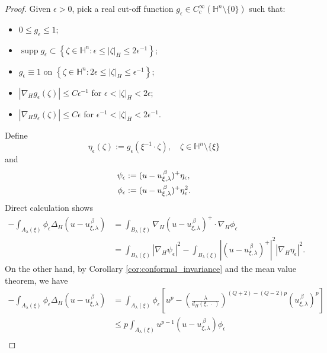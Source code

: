 \documentclass[reqno]{amsart}
\theoremstyle{definition}
\theoremstyle{remark}
\numberwithin{equation}{section}
\begin{document}
\begin{proof}
Given $\epsilon > 0$, pick a real cut-off function $g_{\epsilon} \in C_{c}^{\infty}(\mathbb{H}^n \setminus \{0\})$ such that:
\begin{itemize}
  \item $0 \leq g_{\epsilon} \leq 1$;
  \item $\operatorname{supp} g_{\epsilon} \subset \left\{ \zeta \in \mathbb{H}^n : \epsilon \leq |\zeta|_{\! H} \leq 2\epsilon^{-1} \right\}$;
  \item $g_{\epsilon} \equiv 1$ on $\left\{ \zeta \in \mathbb{H}^n : 2\epsilon \leq |\zeta|_{\! H} \leq \epsilon^{-1} \right\}$;
  \item $\left|\nabla_{\! H} g_{\epsilon}(\zeta)\right| \leq C\epsilon^{-1}$ for $\epsilon < |\zeta|_{\! H} < 2\epsilon$;  
  \item $\left|\nabla_{\! H} g_{\epsilon}(\zeta)\right| \leq C\epsilon$ for $\epsilon^{-1} < |\zeta|_{\! H} < 2\epsilon^{-1}$.
\end{itemize}
Define
\[
\eta_{\epsilon}(\zeta) := g_{\epsilon}(\xi^{-1} \cdot \zeta), \quad \zeta \in \mathbb{H}^n \setminus \{\xi\}
\]
and
\begin{align}\label{eqn:phiepsilon}
\psi_{\epsilon} &:= (u - u_{\xi,\lambda}^{\,\beta})^{+} \eta_{\epsilon},  \notag\\
\phi_{\epsilon} &:= (u - u_{\xi,\lambda}^{\,\beta})^{+} \eta_{\epsilon}^2.
\end{align}
Direct calculation shows
\begin{align*}
- \int_{A_{\lambda}(\xi)} \phi_{\epsilon} \Delta_{\! H} (u - u_{\xi,\lambda}^{\,\beta}) 
&= \int_{B_{\lambda}(\xi)} \nabla_{\! H} (u - u_{\xi,\lambda}^{\,\beta})^{+} \cdot \nabla_{\! H} \phi_{\epsilon} \\
&= \int_{B_{\lambda}(\xi)} \left| \nabla_{\! H} \psi_{\epsilon} \right|^2 - \int_{B_{\lambda}(\xi)} \left| (u - u_{\xi,\lambda}^{\,\beta})^{+} \right|^2 \left| \nabla_{\! H} \eta_{\epsilon} \right|^2.
\end{align*}
On the other hand, by Corollary \ref{cor:conformal_invariance} and the mean value theorem,
we have
\begin{align*}
- \int_{A_{\lambda}(\xi)} \phi_{\epsilon} \Delta_{\! H} (u - u_{\xi,\lambda}^{\,\beta}) 
&= \int_{A_{\lambda}(\xi)} \phi_{\epsilon} \left[ u^{p} - \left( \frac{\lambda}{ d_{\! H} 
(\xi, \,\cdot\,) } \right)^{(Q+2) - (Q-2)p} \left(u_{\xi,\lambda}^{\,\beta}\right)^{p} \right] \\
&\leq p \int_{A_{\lambda}(\xi)} u^{p-1} (u - u_{\xi,\lambda}^{\,\beta}) \phi_{\epsilon} \\

\end{align*}
\end{proof}
\end{document}
